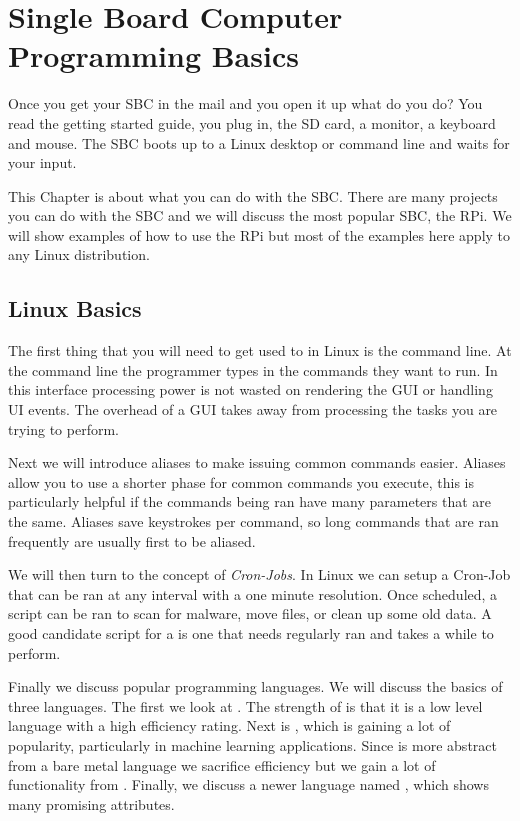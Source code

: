 \chapter{Single Board Computer Programming Basics}

Once you get your \ac{SBC} in the mail and you open it up what do you do? You read the getting started guide, you plug in, the \ac{SD} card, a monitor, a keyboard and mouse. The \ac{SBC} boots up to a Linux desktop or command line and waits for your input. 

This Chapter is about what you can do with the \ac{SBC}. There are many projects you can do with the \ac{SBC} and we will discuss the most popular \ac{SBC}, the \ac{RPi}. We will show examples of how to use the \ac{RPi} but most of the examples here apply to any Linux distribution. 

\section{Linux Basics}

The first thing that you will need to get used to in Linux is the command line. At the command line the programmer types in the commands they want to run. In this interface processing power is not wasted on rendering the \ac{GUI} or handling \ac{UI} events. The overhead of a \ac{GUI} takes away from processing the tasks you are trying to perform. 

Next we will introduce aliases to make issuing common commands easier. Aliases allow you to use a shorter phase for common commands you execute, this is particularly helpful if the commands being ran have many parameters that are the same. Aliases save keystrokes per command, so long commands that are ran frequently are usually first to be aliased. 

We will then turn to the concept of \emph{Cron-Jobs}. In Linux we can setup a Cron-Job that can be ran at any interval with a one minute resolution. Once scheduled, a script can be ran to scan for malware, move files, or clean up some old data. A good candidate script for a  is one that needs regularly ran and takes a while to perform. 

Finally we discuss popular programming languages. We will discuss the basics of three languages. The first we look at . The strength of  is that it is a low level language with a high efficiency rating. Next is , which is gaining a lot of popularity, particularly in machine learning applications. Since  is more abstract from a bare metal language we sacrifice efficiency but we gain a lot of functionality from . Finally, we discuss a newer language named \emph{}, which shows many promising attributes.  
	
